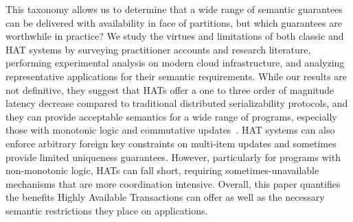 This taxonomy allows us to determine that a wide range of semantic
guarantees can be delivered with availability in face of partitions,
but which guarantees are worthwhile in practice? We study the virtues
and limitations of both classic and HAT systems by surveying
practitioner accounts and research literature, performing experimental
analysis on modern cloud infrastructure, and analyzing representative
applications for their semantic requirements. While our results are
not definitive, they suggest that HATs offer a one to three order of
magnitude latency decrease compared to traditional distributed
serializability protocols, and they can provide acceptable semantics
for a wide range of programs, especially those with monotonic logic
and commutative updates~\cite{calm, blooml, crdt}. HAT systems can
also enforce arbitrary foreign key constraints on multi-item updates
and sometimes provide limited uniqueness guarantees. However,
particularly for programs with non-monotonic logic, HATs can fall
short, requiring sometimes-unavailable mechanisms that are more
coordination intensive. Overall, this paper quantifies the benefits
Highly Available Transactions can offer as well as the necessary
semantic restrictions they place on applications.




